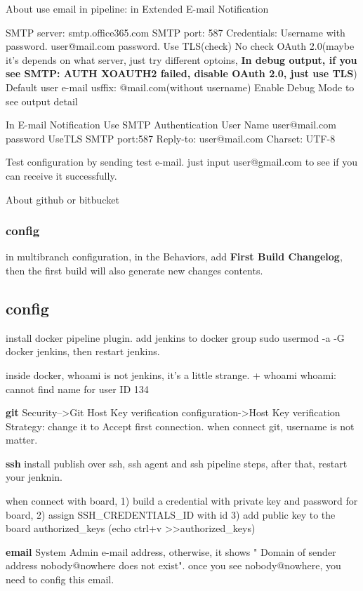 \documentclass[paper=8.5in:11in, twoside, 12pt, pagesize=pdftex]{book}
\begin{document}
About use email in pipeline:
in Extended E-mail Notification

SMTP server: smtp.office365.com
SMTP port: 587
Credentials: Username with password.  user@mail.com password. 
Use TLS(check) No check OAuth 2.0(maybe it's depends on what server, just try different optoins, \textbf{In debug output, if you see SMTP: AUTH XOAUTH2 failed, disable OAuth 2.0, just use TLS})
Default user e-mail usffix: @mail.com(without username)
Enable Debug Mode to see output detail

In E-mail Notification
Use SMTP Authentication
User Name user@mail.com
password
UseTLS
SMTP port:587
Reply-to: user@mail.com
Charset:
UTF-8

Test configuration by sending test e-mail. just input user@gmail.com to see if you can receive it successfully. 


About github or bitbucket 

\subsubsection{config}
in multibranch configuration, in the Behaviors, add \textbf{First Build Changelog}, then the first build will also generate new changes contents. 

\subsection{config}

install docker pipeline plugin. 
add jenkins to docker group sudo usermod -a -G docker jenkins, then restart jenkins.

inside docker, whoami is not jenkins, it's a little strange. 
+ whoami
whoami: cannot find name for user ID 134


\textbf{git}
Security-->Git Host Key verification configuration->Host Key verification Strategy: change it to Accept first connection. when connect git, username is not matter. 


\textbf{ssh}
install publish over ssh, ssh agent  and ssh pipeline steps, after that, restart your jenknin. 

when connect with board, 1) build a credential with private key and password for board, 2) assign SSH\_CREDENTIALS\_ID with id 3) add public key to the board authorized\_keys (echo ctrl+v >>authorized\_keys)


\textbf{email}
System Admin e-mail address, otherwise, it shows " Domain of sender address nobody@nowhere does not exist". once you see nobody@nowhere, you need to config this email. 
\end{document}
